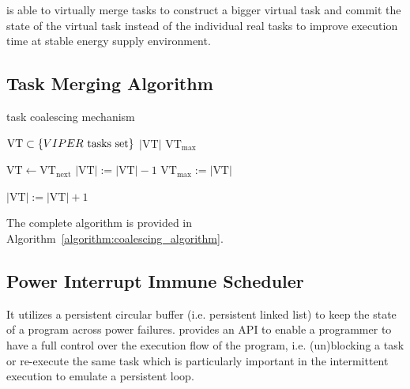 \sys is able to virtually merge tasks to construct a bigger virtual task and commit the state of the virtual task instead of the individual real tasks to improve execution time at stable energy supply environment. 


\subsection{Task Merging Algorithm}

\begin{algorithm}[t]
	\caption{\sys task coalescing mechanism}
	\label{algorithm:coalescing_algorithm}
	\scriptsize
	\begin{algorithmic}[1]
		\State $\text{VT} \subset \{VIPER~\text{tasks set}\}$  
		\State $|\text{VT}|$ 
		\State $\text{VT}_{\max}$ 
		\vspace{0.1cm}
		
		\State $\text{VT} \leftarrow \text{VT}_{\text{next}}$ 
		\vspace{0.1cm}
		 				
		\State $|\text{VT}|:=|\text{VT}|-1$
		\State $\text{VT}_{\max} := |\text{VT}|$ 
		\EndIf
		\EndWhile
		
		\vspace{0.1cm}
		 
		 
		\State $|\text{VT}|:=|\text{VT}|+1$
		\EndIf
		\EndIf
		\EndWhile
	\end{algorithmic}
\end{algorithm}

The complete algorithm is provided in Algorithm~\ref{algorithm:coalescing_algorithm}. 

\subsection{Power Interrupt Immune Scheduler}


It utilizes a persistent circular buffer (i.e. persistent linked list) to keep the state of a program across power failures. \sys provides an API to enable a programmer to have a full control over the execution flow of the program, i.e. (un)blocking a task or re-execute the same task which is particularly important in the intermittent execution to emulate a persistent loop. 

